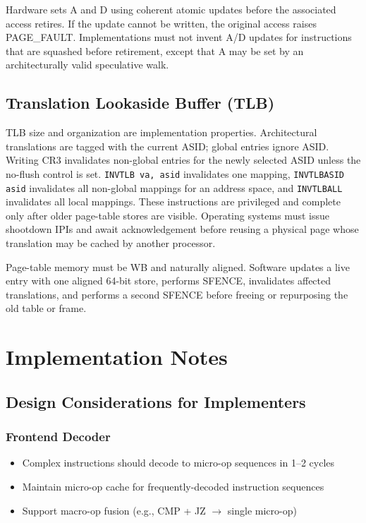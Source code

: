 \documentclass[11pt]{article}
\begin{document}
Hardware sets A and D using coherent atomic updates before the associated access retires. If the update cannot be written, the original access raises PAGE\_FAULT. Implementations must not invent A/D updates for instructions that are squashed before retirement, except that A may be set by an architecturally valid speculative walk.

\subsection{Translation Lookaside Buffer (TLB)}

TLB size and organization are implementation properties. Architectural translations are tagged with the current ASID; global entries ignore ASID. Writing CR3 invalidates non-global entries for the newly selected ASID unless the no-flush control is set. \texttt{INVTLB va, asid} invalidates one mapping, \texttt{INVTLBASID asid} invalidates all non-global mappings for an address space, and \texttt{INVTLBALL} invalidates all local mappings. These instructions are privileged and complete only after older page-table stores are visible. Operating systems must issue shootdown IPIs and await acknowledgement before reusing a physical page whose translation may be cached by another processor.

Page-table memory must be WB and naturally aligned. Software updates a live entry with one aligned 64-bit store, performs SFENCE, invalidates affected translations, and performs a second SFENCE before freeing or repurposing the old table or frame.

\section{Implementation Notes}

\subsection{Design Considerations for Implementers}

\subsubsection{Frontend Decoder}

\begin{itemize}
    \item Complex instructions should decode to micro-op sequences in 1--2 cycles
    \item Maintain micro-op cache for frequently-decoded instruction sequences
    \item Support macro-op fusion (e.g., CMP + JZ $\rightarrow$ single micro-op)
\end{itemize}
\end{document}
